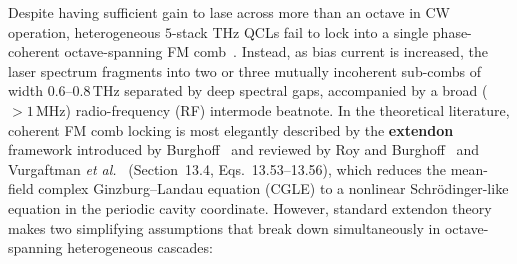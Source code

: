 \documentclass[11pt,letterpaper]{article}
\begin{document}
Despite having sufficient gain to lase across more than an octave in CW operation, heterogeneous $5$-stack THz QCLs fail to lock into a single phase-coherent octave-spanning FM comb~\cite{Jaidl2021,JaidlUnterrainerRoadmap2025,SilvestriRoadmap2025}. Instead, as bias current is increased, the laser spectrum fragments into two or three mutually incoherent sub-combs of width $0.6\text{--}0.8\,\mathrm{THz}$ separated by deep spectral gaps, accompanied by a broad ($>1\,\mathrm{MHz}$) radio-frequency (RF) intermode beatnote. In the theoretical literature, coherent FM comb locking is most elegantly described by the \textbf{extendon} framework introduced by Burghoff~\cite{Burghoff2020} and reviewed by Roy and Burghoff~\cite{RoyBurghoffRoadmap2025} and Vurgaftman \textit{et al.}~\cite{Vurgaftman2021} (Section~13.4, Eqs.~13.53--13.56), which reduces the mean-field complex Ginzburg--Landau equation (CGLE) to a nonlinear Schr\"odinger-like equation in the periodic cavity coordinate. However, standard extendon theory makes two simplifying assumptions that break down simultaneously in octave-spanning heterogeneous cascades:
\end{document}

